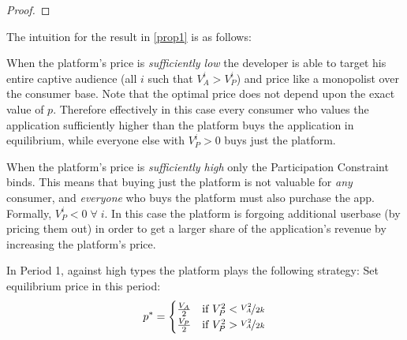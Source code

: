 \documentclass[12pt]{article}
\begin{document}
\begin{proof}





\end{proof}

The intuition for the result in \ref{prop1} is as follows: 

When the platform's price is \emph{sufficiently low} the developer is able to
target his entire captive audience (all $i$ such that $V_A^i > V_P^i$)
and price like a monopolist over the consumer base. Note that the
optimal price does not depend upon the exact value of $p$. Therefore
effectively in this case every consumer who values the application
sufficiently higher than the platform buys the application in
equilibrium, while everyone else with $V_P^i>0$ buys just the platform.

When the platform's price is \emph{sufficiently high} only the
Participation Constraint binds. This means that buying just the
platform is not valuable for \emph{any} consumer, and \emph{everyone}
who buys the platform must also purchase the app. Formally, $V_P^i<0
\; \forall \; i$. In this case the platform is forgoing additional
userbase (by pricing them out) in order to get a larger share of the application's
revenue by increasing the platform's price.

\begin{proposition}
\label{prop2}
In Period 1, against high types the platform plays the following strategy:
Set equilibrium price in this period:\[ p^* = 
\begin{cases}

  \frac{V_A}{2} & \text{if ${V_P^2}<\nicefrac{V_A^2}{2k}$} \\
  \frac{V_P}{2} & \text{if ${V_P^2}>\nicefrac{V_A^2}{2k}$} \\

\end{cases} \]

\end{proposition}
\end{document}
